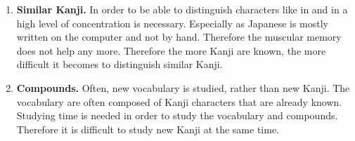 \begin{enumerate}
  \item \textbf{Similar Kanji.} In order to be able to distinguish characters 
        like  in  and  in  a high level of
        concentration is necessary. Especially as Japanese is mostly written
        on the computer and not by hand. Therefore the muscular memory 
        does not help any more. Therefore the more Kanji are known, the more 
        difficult it becomes to distinguish similar Kanji.

  \item \textbf{Compounds.} Often, new vocabulary is studied, rather than new 
        Kanji. The vocabulary are often composed of Kanji characters that are 
        already known. Studying time is needed in order to study the vocabulary 
        and compounds. Therefore it is difficult to study new Kanji at the same
        time.


\end{enumerate}
